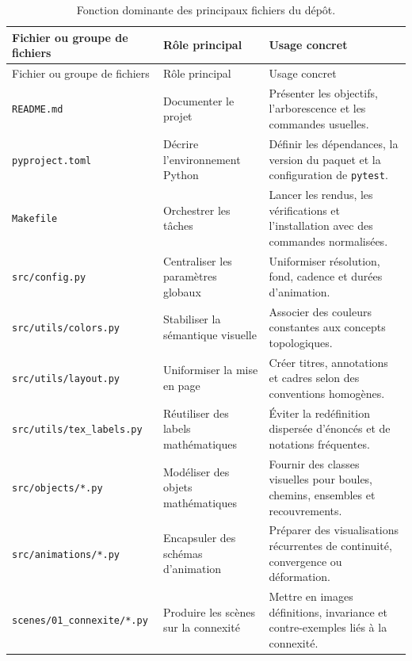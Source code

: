 \documentclass[12pt, a4paper, openany]{report}
\begin{document}
	\begin{longtable}{
		>{\raggedright\arraybackslash}p{4.1cm}
		>{\raggedright\arraybackslash}p{4.4cm}
		>{\raggedright\arraybackslash}p{5.2cm}
	}
		\caption{Fonction dominante des principaux fichiers du dépôt.}\label{tab:cartographie_fichiers}\\
		\toprule
		\rowcolor{SorbonneBleu!8}
		\textcolor{SorbonneBleu}{Fichier ou groupe de fichiers} &
		\textcolor{SorbonneBleu}{Rôle principal} &
		\textcolor{SorbonneBleu}{Usage concret} \\
		\midrule
		\endfirsthead
		\toprule
		\rowcolor{SorbonneBleu!8}
		\textcolor{SorbonneBleu}{Fichier ou groupe de fichiers} &
		\textcolor{SorbonneBleu}{Rôle principal} &
		\textcolor{SorbonneBleu}{Usage concret} \\
		\midrule
		\endhead
		\texttt{README.md} &
		Documenter le projet &
		Présenter les objectifs, l’arborescence et les commandes usuelles. \\
		\texttt{pyproject.toml} &
		Décrire l’environnement Python &
		Définir les dépendances, la version du paquet et la configuration de \texttt{pytest}. \\
		\texttt{Makefile} &
		Orchestrer les tâches &
		Lancer les rendus, les vérifications et l’installation avec des commandes normalisées. \\
		\texttt{src/config.py} &
		Centraliser les paramètres globaux &
		Uniformiser résolution, fond, cadence et durées d’animation. \\
		\texttt{src/utils/colors.py} &
		Stabiliser la sémantique visuelle &
		Associer des couleurs constantes aux concepts topologiques. \\
		\texttt{src/utils/layout.py} &
		Uniformiser la mise en page &
		Créer titres, annotations et cadres selon des conventions homogènes. \\
		\texttt{src/utils/tex\_labels.py} &
		Réutiliser des labels mathématiques &
		Éviter la redéfinition dispersée d’énoncés et de notations fréquentes. \\
		\texttt{src/objects/*.py} &
		Modéliser des objets mathématiques &
		Fournir des classes visuelles pour boules, chemins, ensembles et recouvrements. \\
		\texttt{src/animations/*.py} &
		Encapsuler des schémas d’animation &
		Préparer des visualisations récurrentes de continuité, convergence ou déformation. \\
		\texttt{scenes/01\_connexite/*.py} &
		Produire les scènes sur la connexité &
		Mettre en images définitions, invariance et contre-exemples liés à la connexité. \\

\end{longtable}
\end{document}
